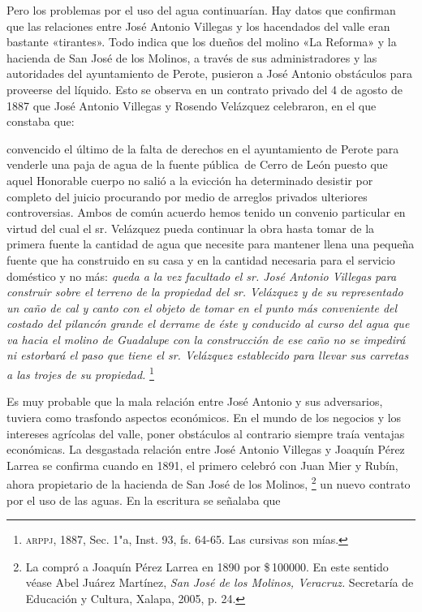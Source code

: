 \documentclass[14pt,twoside,final]{extbook} %
\let\oldfootnote\footnote
\renewcommand\footnote[1]{%
\oldfootnote{\hspace{1mm}#1}}
\begin{document}
Pero los problemas por el uso del agua continuarían. Hay datos que confirman que las relaciones entre José Antonio Villegas y los hacendados del valle eran bastante «tirantes». Todo indica que los dueños del molino «La Reforma» y la hacienda de San José de los Molinos, a través de sus administradores y las autoridades del ayuntamiento de Perote, pusieron a José Antonio obstáculos para proveerse del líquido. Esto se observa en un contrato privado del 4 de agosto de 1887 que José Antonio Villegas y Rosendo Velázquez celebraron, en el que constaba que:
\begin{quoting}
convencido el último de la falta de derechos en el ayuntamiento de Perote para venderle una paja de agua de la fuente pública~de Cerro de León puesto que aquel Honorable cuerpo no salió a la evicción ha determinado desistir por completo del juicio procurando por medio de arreglos privados ulteriores controversias. Ambos de común acuerdo hemos tenido un convenio particular en virtud del cual el sr. Velázquez pueda continuar la obra hasta tomar de la primera fuente la cantidad de agua que necesite para mantener llena una pequeña fuente que ha construido en su casa y en la cantidad necesaria para el servicio doméstico y no más: \emph{queda a la vez facultado el sr. José Antonio Villegas para construir sobre el terreno de la propiedad del sr. Velázquez y de su representado un caño de cal y canto con el objeto de tomar en el punto más conveniente del costado del pilancón grande el derrame de éste y conducido al curso del agua que va hacia el molino de Guadalupe con la construcción de ese caño no se impedirá ni estorbará el paso que tiene el sr. Velázquez establecido para llevar sus carretas a las trojes de su propiedad.}\footnote{\textsc{arppj}, 1887, Sec. 1"a, Inst. 93, fs. 64-65. Las cursivas son mías.}
\end{quoting}
Es muy probable que la mala relación entre José Antonio y sus adversarios, tuviera como trasfondo aspectos económicos. En el mundo de los negocios y los intereses agrícolas del valle, poner obstáculos al contrario siempre traía ventajas económicas. La desgastada relación entre José Antonio Villegas y Joaquín Pérez Larrea se confirma cuando en 1891, el primero celebró con Juan Mier y Rubín, ahora propietario de la hacienda de San José de los Molinos,\footnote{La compró a Joaquín Pérez Larrea en 1890 por \$\,100000. En este sentido véase Abel Juárez Martínez, \emph{San José de los Molinos, Veracruz.} Secretaría de Educación y Cultura, Xalapa, 2005, p. 24.} un nuevo contrato por el uso de las aguas. En la escritura se señalaba que
\end{document}
